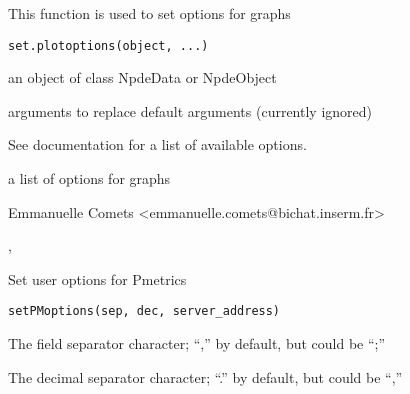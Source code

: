 \documentclass[a4paper]{book}
\begin{document}
%
\begin{Description}\relax
This function is used to set options for graphs
\end{Description}
%
\begin{Usage}
\begin{verbatim}
set.plotoptions(object, ...)
\end{verbatim}
\end{Usage}
%
\begin{Arguments}
\begin{ldescription}
\item[\code{object}] an object of class NpdeData or NpdeObject

\item[\code{...}] arguments to replace default arguments (currently ignored)
\end{ldescription}
\end{Arguments}
%
\begin{Details}\relax
See documentation for a list of available options.
\end{Details}
%
\begin{Value}
a list of options for graphs
\end{Value}
%
\begin{Author}\relax
Emmanuelle Comets <emmanuelle.comets@bichat.inserm.fr>
\end{Author}
%
\begin{SeeAlso}\relax
{}, 
\end{SeeAlso}
%
\begin{Description}\relax
Set user options for Pmetrics
\end{Description}
%
\begin{Usage}
\begin{verbatim}
setPMoptions(sep, dec, server_address)
\end{verbatim}
\end{Usage}
%
\begin{Arguments}
\begin{ldescription}
\item[\code{sep}] The field separator character; ``,'' by default, but could be ``;''

\item[\code{dec}] The decimal separator character; ``.'' by default, but could be ``,''
\end{ldescription}
\end{Arguments}
\end{document}
